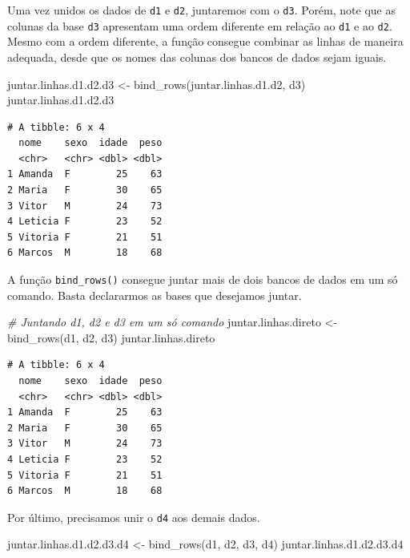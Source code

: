\documentclass[
  brazilian,
]{book}
\newenvironment{Shaded}{\begin{snugshade}}{\end{snugshade}}
\newcommand{\CommentTok}[1]{\textcolor[rgb]{0.56,0.35,0.01}{\textit{#1}}}
\newcommand{\FunctionTok}[1]{\textcolor[rgb]{0.00,0.00,0.00}{#1}}
\newcommand{\NormalTok}[1]{#1}
\newcommand{\OtherTok}[1]{\textcolor[rgb]{0.56,0.35,0.01}{#1}}
\begin{document}
Uma vez unidos os dados de \texttt{d1} e \texttt{d2}, juntaremos com o \texttt{d3}. Porém, note que as colunas da base \texttt{d3} apresentam uma ordem diferente em relação ao \texttt{d1} e ao \texttt{d2}. Mesmo com a ordem diferente, a função consegue combinar as linhas de maneira adequada, desde que os nomes das colunas dos bancos de dados sejam iguais.

\begin{Shaded}
\begin{Highlighting}[]
\NormalTok{juntar.linhas.d1.d2.d3 }\OtherTok{\textless{}{-}} \FunctionTok{bind\_rows}\NormalTok{(juntar.linhas.d1.d2, d3)}
\NormalTok{juntar.linhas.d1.d2.d3}
\end{Highlighting}
\end{Shaded}

\begin{verbatim}
# A tibble: 6 x 4
  nome    sexo  idade  peso
  <chr>   <chr> <dbl> <dbl>
1 Amanda  F        25    63
2 Maria   F        30    65
3 Vitor   M        24    73
4 Leticia F        23    52
5 Vitoria F        21    51
6 Marcos  M        18    68
\end{verbatim}

A função \texttt{bind\_rows()} consegue juntar mais de dois bancos de dados em um só comando. Basta declararmos as bases que desejamos juntar.

\begin{Shaded}
\begin{Highlighting}[]
\CommentTok{\# Juntando d1, d2 e d3 em um só comando}
\NormalTok{juntar.linhas.direto }\OtherTok{\textless{}{-}} \FunctionTok{bind\_rows}\NormalTok{(d1, d2, d3)}
\NormalTok{juntar.linhas.direto}
\end{Highlighting}
\end{Shaded}

\begin{verbatim}
# A tibble: 6 x 4
  nome    sexo  idade  peso
  <chr>   <chr> <dbl> <dbl>
1 Amanda  F        25    63
2 Maria   F        30    65
3 Vitor   M        24    73
4 Leticia F        23    52
5 Vitoria F        21    51
6 Marcos  M        18    68
\end{verbatim}

Por último, precisamos unir o \texttt{d4} aos demais dados.

\begin{Shaded}
\begin{Highlighting}[]
\NormalTok{juntar.linhas.d1.d2.d3.d4 }\OtherTok{\textless{}{-}} \FunctionTok{bind\_rows}\NormalTok{(d1, d2, d3, d4)}
\NormalTok{juntar.linhas.d1.d2.d3.d4}
\end{Highlighting}
\end{Shaded}
\end{document}

